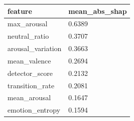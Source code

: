 \begin{tabular}{ll}
\toprule
feature & mean\_abs\_shap \\
\midrule
max\_arousal & 0.6389 \\
neutral\_ratio & 0.3707 \\
arousal\_variation & 0.3663 \\
mean\_valence & 0.2694 \\
detector\_score & 0.2132 \\
transition\_rate & 0.2081 \\
mean\_arousal & 0.1647 \\
emotion\_entropy & 0.1594 \\
\bottomrule
\end{tabular}
